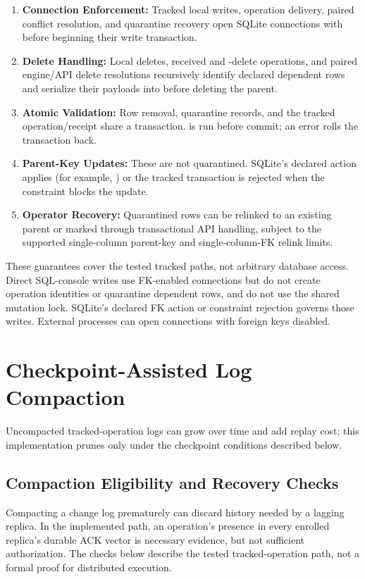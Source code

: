 \documentclass[runningheads]{llncs}
\begin{document}
\begin{enumerate}
\item \textbf{Connection Enforcement:} Tracked local writes, operation delivery, paired conflict resolution, and quarantine recovery open SQLite connections with \texttt{} before beginning their write transaction.
\item \textbf{Delete Handling:} Local deletes, received \texttt{} and \texttt{}-delete operations, and paired engine/API delete resolutions recursively identify declared dependent rows and serialize their payloads into \texttt{} before deleting the parent.
\item \textbf{Atomic Validation:} Row removal, quarantine records, and the tracked operation/receipt share a transaction. \texttt{} is run before commit; an error rolls the transaction back.
\item \textbf{Parent-Key Updates:} These are not quarantined. SQLite's declared \texttt{} action applies (for example, \texttt{}) or the tracked transaction is rejected when the constraint blocks the update.
\item \textbf{Operator Recovery:} Quarantined rows can be relinked to an existing parent or marked \texttt{} through transactional API handling, subject to the supported single-column parent-key and single-column-FK relink limits.
\end{enumerate}
These guarantees cover the tested tracked paths, not arbitrary database access. Direct SQL-console writes use FK-enabled connections but do not create operation identities or quarantine dependent rows, and do not use the shared mutation lock. SQLite's declared FK action or constraint rejection governs those writes. External processes can open connections with foreign keys disabled.

\section{Checkpoint-Assisted Log Compaction}
Uncompacted tracked-operation logs can grow over time and add replay cost; this implementation prunes only under the checkpoint conditions described below.

\subsection{Compaction Eligibility and Recovery Checks}
Compacting a change log prematurely can discard history needed by a lagging replica. In the implemented \texttt{} path, an operation's presence in every enrolled replica's durable ACK vector is necessary evidence, but not sufficient authorization. The checks below describe the tested tracked-operation path, not a formal proof for distributed execution.
\end{document}
